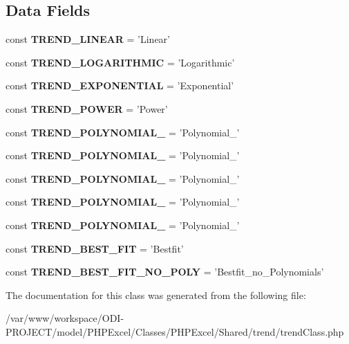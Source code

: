\subsection*{Data Fields}
\begin{DoxyCompactItemize}
\item 
const {\bfseries T\+R\+E\+N\+D\+\_\+\+L\+I\+N\+E\+A\+R} = 'Linear'\label{classtrend_class_a48561d4e618adb9131e148ba1462f6ca}

\item 
const {\bfseries T\+R\+E\+N\+D\+\_\+\+L\+O\+G\+A\+R\+I\+T\+H\+M\+I\+C} = 'Logarithmic'\label{classtrend_class_a37bfb7eefe332927c6dac80b13169690}

\item 
const {\bfseries T\+R\+E\+N\+D\+\_\+\+E\+X\+P\+O\+N\+E\+N\+T\+I\+A\+L} = 'Exponential'\label{classtrend_class_aa6976afc0bc47521e1dd5509a168b704}

\item 
const {\bfseries T\+R\+E\+N\+D\+\_\+\+P\+O\+W\+E\+R} = 'Power'\label{classtrend_class_af1b641ace146f3c7e709012fc9ad879d}

\item 
const {\bfseries T\+R\+E\+N\+D\+\_\+\+P\+O\+L\+Y\+N\+O\+M\+I\+A\+L\+\_} = 'Polynomial\+\_'\label{classtrend_class_a3eab89956dce655ad6e421c0ce19daa7}

\item 
const {\bfseries T\+R\+E\+N\+D\+\_\+\+P\+O\+L\+Y\+N\+O\+M\+I\+A\+L\+\_} = 'Polynomial\+\_'\label{classtrend_class_accaa3d7cb46f17acb5d5800dd2781013}

\item 
const {\bfseries T\+R\+E\+N\+D\+\_\+\+P\+O\+L\+Y\+N\+O\+M\+I\+A\+L\+\_} = 'Polynomial\+\_'\label{classtrend_class_a5fc08b96e6840e44d49f98c0ecfcd902}

\item 
const {\bfseries T\+R\+E\+N\+D\+\_\+\+P\+O\+L\+Y\+N\+O\+M\+I\+A\+L\+\_} = 'Polynomial\+\_'\label{classtrend_class_a12ad11a37e0c4adc625e54c587801206}

\item 
const {\bfseries T\+R\+E\+N\+D\+\_\+\+P\+O\+L\+Y\+N\+O\+M\+I\+A\+L\+\_} = 'Polynomial\+\_'\label{classtrend_class_a5cb11e3b1a2dd0136d9fc1ff206e7331}

\item 
const {\bfseries T\+R\+E\+N\+D\+\_\+\+B\+E\+S\+T\+\_\+\+F\+I\+T} = 'Bestfit'\label{classtrend_class_acdf740918f18da2952863e57080bdbd4}

\item 
const {\bfseries T\+R\+E\+N\+D\+\_\+\+B\+E\+S\+T\+\_\+\+F\+I\+T\+\_\+\+N\+O\+\_\+\+P\+O\+L\+Y} = 'Bestfit\+\_\+no\+\_\+\+Polynomials'\label{classtrend_class_abb6b857d3c47a8ff9eec01e2f199e85e}

\end{DoxyCompactItemize}


The documentation for this class was generated from the following file\+:\begin{DoxyCompactItemize}
\item 
/var/www/workspace/\+O\+D\+I-\/\+P\+R\+O\+J\+E\+C\+T/model/\+P\+H\+P\+Excel/\+Classes/\+P\+H\+P\+Excel/\+Shared/trend/trend\+Class.\+php\end{DoxyCompactItemize}

